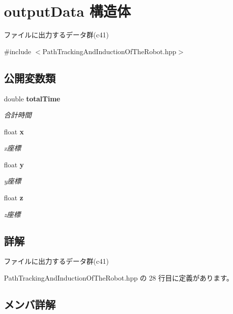\section{output\-Data 構造体}
\label{structoutput_data}


ファイルに出力するデータ群(c41)  




{\ttfamily \#include $<$Path\-Tracking\-And\-Induction\-Of\-The\-Robot.\-hpp$>$}

\subsection*{公開変数類}
\begin{DoxyCompactItemize}
\item 
double {\bf total\-Time}
\begin{DoxyCompactList}\small\item\em 合計時間 \end{DoxyCompactList}\item 
float {\bf x}
\begin{DoxyCompactList}\small\item\em x座標 \end{DoxyCompactList}\item 
float {\bf y}
\begin{DoxyCompactList}\small\item\em y座標 \end{DoxyCompactList}\item 
float {\bf z}
\begin{DoxyCompactList}\small\item\em z座標 \end{DoxyCompactList}\end{DoxyCompactItemize}


\subsection{詳解}
ファイルに出力するデータ群(c41) 

 Path\-Tracking\-And\-Induction\-Of\-The\-Robot.\-hpp の 28 行目に定義があります。



\subsection{メンバ詳解}
